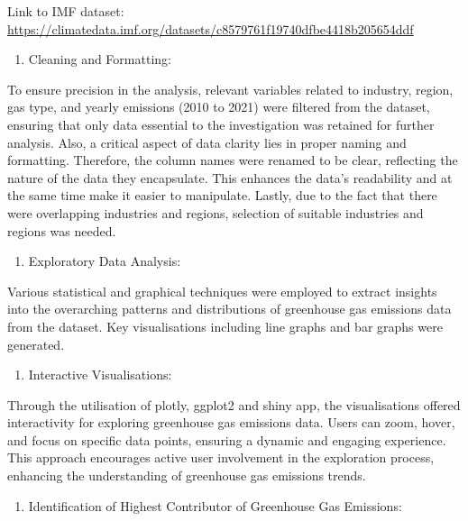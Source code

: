 \documentclass[
]{article}
\providecommand{\tightlist}{%
  \setlength{\itemsep}{0pt}\setlength{\parskip}{0pt}}
\begin{document}
Link to IMF dataset:
\url{https://climatedata.imf.org/datasets/c8579761f19740dfbe4418b205654ddf}

\begin{enumerate}
\def\labelenumi{\arabic{enumi}.}
\setcounter{enumi}{1}
\tightlist
\item
  Cleaning and Formatting:
\end{enumerate}

To ensure precision in the analysis, relevant variables related to
industry, region, gas type, and yearly emissions (2010 to 2021) were
filtered from the dataset, ensuring that only data essential to the
investigation was retained for further analysis. Also, a critical aspect
of data clarity lies in proper naming and formatting. Therefore, the
column names were renamed to be clear, reflecting the nature of the data
they encapsulate. This enhances the data's readability and at the same
time make it easier to manipulate. Lastly, due to the fact that there
were overlapping industries and regions, selection of suitable
industries and regions was needed.

\begin{enumerate}
\def\labelenumi{\arabic{enumi}.}
\setcounter{enumi}{2}
\tightlist
\item
  Exploratory Data Analysis:
\end{enumerate}

Various statistical and graphical techniques were employed to extract
insights into the overarching patterns and distributions of greenhouse
gas emissions data from the dataset. Key visualisations including line
graphs and bar graphs were generated.

\begin{enumerate}
\def\labelenumi{\arabic{enumi}.}
\setcounter{enumi}{3}
\tightlist
\item
  Interactive Visualisations:
\end{enumerate}

Through the utilisation of plotly, ggplot2 and shiny app, the
visualisations offered interactivity for exploring greenhouse gas
emissions data. Users can zoom, hover, and focus on specific data
points, ensuring a dynamic and engaging experience. This approach
encourages active user involvement in the exploration process, enhancing
the understanding of greenhouse gas emissions trends.

\begin{enumerate}
\def\labelenumi{\arabic{enumi}.}
\setcounter{enumi}{4}
\tightlist
\item
  Identification of Highest Contributor of Greenhouse Gas Emissions:
\end{enumerate}
\end{document}
